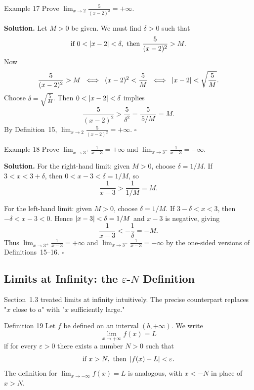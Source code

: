 \begin{examplebox}{Example 17}
Prove \(\displaystyle\lim_{x \to 2} \frac{5}{(x-2)^{2}} = +\infty\).

\medskip
\textbf{Solution.}
Let \(M > 0\) be given. We must find \(\delta > 0\) such that
\[
\text{if } 0 < \left|x - 2\right| < \delta,\text{ then } \frac{5}{(x-2)^{2}} > M.
\]
Now
\[
\frac{5}{(x-2)^{2}} > M
\;\iff\; (x-2)^{2} < \frac{5}{M}
\;\iff\; \left|x-2\right| < \sqrt{\frac{5}{M}}.
\]
Choose \(\delta = \sqrt{\frac{5}{M}}\). Then \(0 < \left|x - 2\right| < \delta\) implies
\[
\frac{5}{(x-2)^{2}}
> \frac{5}{\delta^{2}}
= \frac{5}{\,5/M\,}
= M.
\]
By Definition~15, \(\displaystyle\lim_{x \to 2} \frac{5}{(x-2)^{2}} = +\infty\). \(\square\)
\end{examplebox}

\begin{examplebox}{Example 18}
Prove \(\displaystyle\lim_{x \to 3^{+}} \frac{1}{x-3} = +\infty\) and \(\displaystyle\lim_{x \to 3^{-}} \frac{1}{x-3} = -\infty\).

\medskip
\textbf{Solution.}
For the right-hand limit: given \(M > 0\), choose \(\delta = 1/M\). If \(3 < x < 3 + \delta\), then \(0 < x - 3 < \delta = 1/M\), so
\[
\frac{1}{x-3} > \frac{1}{1/M} = M.
\]

For the left-hand limit: given \(M > 0\), choose \(\delta = 1/M\). If \(3 - \delta < x < 3\), then \(-\delta < x-3 < 0\). Hence \(\left|x-3\right| < \delta = 1/M\) and \(x-3\) is negative, giving
\[
\frac{1}{x-3} < -\frac{1}{\delta} = -M.
\]
Thus \(\lim_{x \to 3^{+}} \frac{1}{x-3} = +\infty\) and \(\lim_{x \to 3^{-}} \frac{1}{x-3} = -\infty\) by the one-sided versions of Definitions~15--16. \(\square\)
\end{examplebox}

\subsection*{Limits at Infinity: the \texorpdfstring{\(\varepsilon\)-\(N\)}{epsilon-N} Definition}
\label{subsec:1.4.6}

Section~1.3 treated limits at infinity intuitively. The precise counterpart replaces "\(x\) close to \(a\)" with "\(x\) sufficiently large."

\begin{definitionbox}{Definition 19}
Let \(f\) be defined on an interval \((b, +\infty)\). We write
\[
\lim_{x \to +\infty} f(x) = L
\]
if for every \(\varepsilon > 0\) there exists a number \(N > 0\) such that
\[
\text{if } x > N,\text{ then } \left|f(x) - L\right| < \varepsilon.
\]
The definition for \(\lim_{x \to -\infty} f(x) = L\) is analogous, with \(x < -N\) in place of \(x > N\).
\end{definitionbox}


